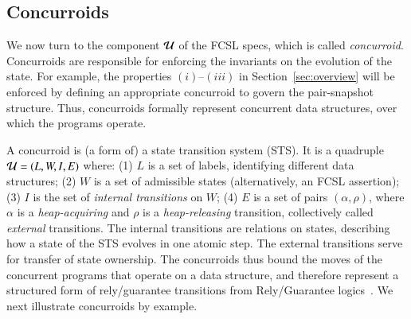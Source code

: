 \subsection{Concurroids}
\label{sec:concurroids}

We now turn to the component $\mathcal{U}$ of the FCSL specs, which is
called \emph{concurroid}. Concurroids are responsible for enforcing
the invariants on the evolution of the state. For example, the
properties $(i)${--}$(iii)$ in Section~\ref{sec:overview} will be
enforced by defining an appropriate concurroid to govern the
pair-snapshot structure. Thus, concurroids formally represent
concurrent data structures, over which the programs operate.

A concurroid is (a form of) a state transition system (STS). It is a
quadruple $\mathcal{U} = ({L}, W, I, {E})$ where: (1) $L$ is a set of
labels, identifying different data structures; (2) $W$ is a set of
admissible states (alternatively, an FCSL assertion); (3) $I$ is the
set of \emph{internal transitions} on $W$; (4) $E$ is a set of pairs
$(\alpha, \rho)$, where $\alpha$ is a \emph{heap-acquiring} and $\rho$
is a \emph{heap-releasing} transition, collectively called
\emph{external} transitions. The internal transitions are relations on
states, describing how a state of the STS evolves in one atomic
step. The external transitions serve for transfer of state
ownership. The concurroids thus bound the moves of the concurrent
programs that operate on a data structure, and therefore represent a
structured form of rely/guarantee transitions from Rely/Guarantee
logics~\cite{Feng-al:ESOP07,Vafeiadis:PhD,Jones:IFIP83,Feng:POPL09,Vafeiadis-Parkinson:CONCUR07}. We
next illustrate concurroids by example.

